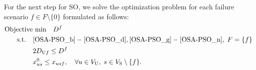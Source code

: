 \documentclass[10pt, letterpaper]{IEEEtran}
\newcommand\red[1]{\textcolor{red}{#1}}
\begin{document}
\begin{CJK}{UTF8}{ipxm}
For the next step for SO, we solve the optimization problem for each failure scenario $f \in F \setminus \{0\}$ formulated as follows:
\begin{subequations} \label{OSA-SO}
  \begin{align}
  \text{Objective}&\text{ min}\quad D^f \label{OSA-SO_a} \\
  \rm{s.t.} \quad
  & \eqref{OSA-PSO_b}-\eqref{OSA-PSO_d}, \eqref{OSA-PSO_g}-\eqref{OSA-PSO_n}, \; F = \{f\} \label{OSA-SO_b-d,g-n} \\
  &2D_{\mathrm{U}f} \le D^f \label{OSA-SO_h} \\
  &x^0_{us} \le x_{usf}, \quad \forall u \in V_{\rm{U}}, \; s \in V_{\rm{S}} \setminus \{f\}. \label{OSA-SO_i}
  \end{align}
\end{subequations}

\end{CJK}
\end{document}
